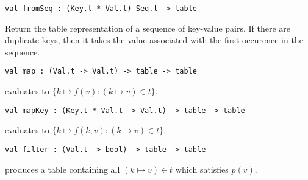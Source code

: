 \begin{cluster}
\label{grp:grm:aug-ordtable-interface::fromseq}

\begin{gram}[fromSeq]
\label{grm:aug-ordtable-interface::fromseq}
\begin{verbatim}
val fromSeq : (Key.t * Val.t) Seq.t -> table
\end{verbatim}
Return the table representation of a sequence of key-value pairs. If there are
duplicate keys, then it takes the value associated with the first occurence in
the sequence.

\end{gram}
\end{cluster}

\begin{cluster}
\label{grp:grm:aug-ordtable-interface::map}

\begin{gram}[map]
\label{grm:aug-ordtable-interface::map}
\begin{verbatim}
val map : (Val.t -> Val.t) -> table -> table
\end{verbatim}
 evaluates to $\{k \mapsto f(v) : (k \mapsto v) \in t\}$.

\end{gram}
\end{cluster}

\begin{cluster}
\label{grp:grm:aug-ordtable-interface::mapkey}

\begin{gram}[mapKey]
\label{grm:aug-ordtable-interface::mapkey}
\begin{verbatim}
val mapKey : (Key.t * Val.t -> Val.t) -> table -> table
\end{verbatim}
 evaluates to $\{k \mapsto f(k, v) : (k \mapsto v) \in t\}$.

\end{gram}
\end{cluster}

\begin{cluster}
\label{grp:grm:aug-ordtable-interface::filter}

\begin{gram}[filter]
\label{grm:aug-ordtable-interface::filter}
\begin{verbatim}
val filter : (Val.t -> bool) -> table -> table
\end{verbatim}
 produces a table containing all $(k \mapsto v) \in t$ which
satisfies $p(v)$.

\end{gram}
\end{cluster}

